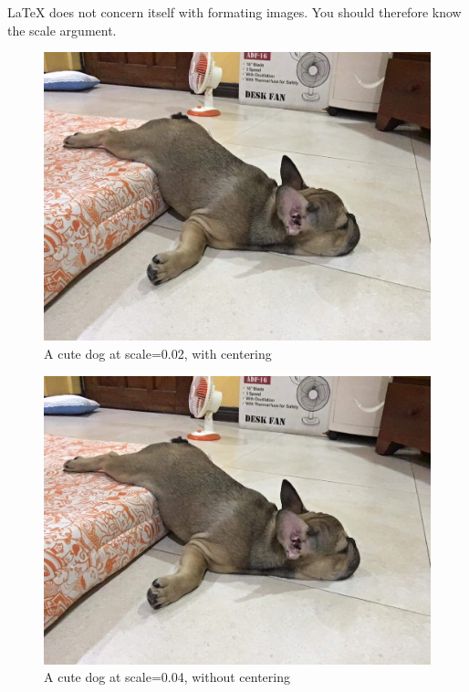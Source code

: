\documentclass{article}
\begin{document}
        \LaTeX \hspace{} does not concern itself with formating images. You should therefore know the scale argument. 
        \begin{figure}[h]
            \centering
            \includegraphics[scale=0.01]{dog} %
            \caption{A cute dog at scale=0.02, with centering}
            \label{smalldog} %
        \end{figure}
        
        \begin{figure}[h]
            \includegraphics[scale=0.04]{dog}
            \caption{A cute dog at scale=0.04, without centering}
            \label{bigdog}
        \end{figure}
\end{document}
